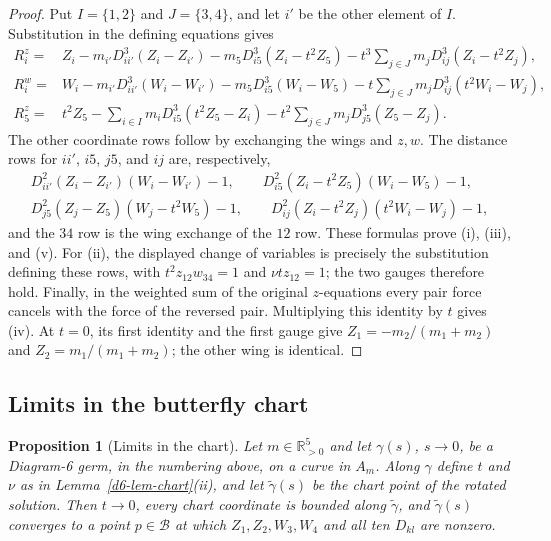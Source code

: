 \documentclass[11pt]{amsart}
\newtheorem{proposition}[theorem]{Proposition}
\theoremstyle{definition}
\theoremstyle{remark}
\newcommand{\Rp}{\mathbb{R}_{>0}}
\begin{document}
{\begin{proof}
Put $I=\{1,2\}$ and $J=\{3,4\}$, and let $i'$ be the other element of $I$.
Substitution in the defining equations gives
\begin{align*}
R_i^z={}&Z_i-m_{i'}D_{ii'}^3(Z_i-Z_{i'})
 -m_5D_{i5}^3(Z_i-t^2Z_5)
 -t^3\sum_{j\in J}m_jD_{ij}^3(Z_i-t^2Z_j),\\
R_i^w={}&W_i-m_{i'}D_{ii'}^3(W_i-W_{i'})
 -m_5D_{i5}^3(W_i-W_5)
 -t\sum_{j\in J}m_jD_{ij}^3(t^2W_i-W_j),\\
R_5^z={}&t^2Z_5-\sum_{i\in I}m_iD_{i5}^3(t^2Z_5-Z_i)
 -t^2\sum_{j\in J}m_jD_{j5}^3(Z_5-Z_j).
\end{align*}
The other coordinate rows follow by exchanging the wings and $z,w$.
The distance rows for $ii'$, $i5$, $j5$, and $ij$ are, respectively,
\begin{gather*}
D_{ii'}^2(Z_i-Z_{i'})(W_i-W_{i'})-1,\qquad
D_{i5}^2(Z_i-t^2Z_5)(W_i-W_5)-1,\\
D_{j5}^2(Z_j-Z_5)(W_j-t^2W_5)-1,\qquad
D_{ij}^2(Z_i-t^2Z_j)(t^2W_i-W_j)-1,
\end{gather*}
and the $34$ row is the wing exchange of the $12$ row.
These formulas prove (i), (iii), and (v). For (ii), the displayed change of
variables is precisely the substitution defining these rows, with
$t^2z_{12}w_{34}=1$ and $\nu tz_{12}=1$; the two gauges therefore hold.
Finally, in the weighted sum of the original $z$-equations every pair force
cancels with the force of the reversed pair. Multiplying this identity by
$t$ gives (iv). At $t=0$, its first identity and the first gauge give
$Z_1=-m_2/(m_1+m_2)$ and $Z_2=m_1/(m_1+m_2)$; the other wing is identical.
\end{proof}

}\subsection{Limits in the butterfly chart}

\begin{proposition}[Limits in the chart]\label{prop:d6-cover}
Let $m\in\Rp^5$ and let $\gamma(s)$, $s\to0$, be a Diagram-6 germ, in the numbering above, on a
curve in $A_m$.  Along $\gamma$ define $t$ and $\nu$ as in Lemma~\ref{d6-lem-chart}(ii), and
let $\tilde\gamma(s)$ be the chart point of the rotated solution.  Then $t\to0$, every chart
coordinate is bounded along $\tilde\gamma$, and $\tilde\gamma(s)$ converges to a point
$p\in\mathcal B$ at which $Z_1,Z_2,W_3,W_4$ and all ten $D_{kl}$ are nonzero.
\end{proposition}
\end{document}
